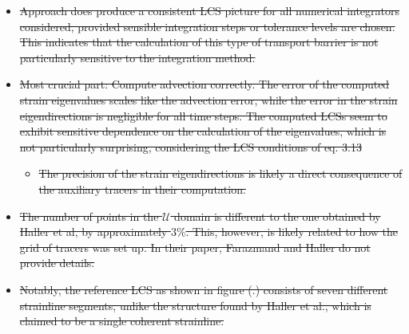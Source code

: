 \begin{framed}
    \begin{itemize}
        \item \sout{Approach does produce a consistent LCS picture for all numerical integrators considered, provided sensible
            integration steps or tolerance levels are chosen. This indicates that the calculation of this type
        of transport barrier is not particularly sensitive to the integration method.}
    \item \sout{Most crucial part: Compute advection correctly. The error of the computed strain eigenvalues scales
                like the advection error, while the error in the strain eigendirections is negligible for all time
                steps. The computed LCSs seem to exhibit sensitive dependence on the calculation of the eigenvalues,
            which is not particularly surprising, considering the LCS conditions of eq. 3.13 }
                \begin{itemize}
                    \item \sout{The precision of the strain eigendirections is likely a direct consequence of the
                        auxiliary tracers in their computation.}
                \end{itemize}
            \item \sout{The number of points in the $\mathcal{U}$ domain is different to the one obtained by
                Haller et  al, by approximately $3\%$. This, however, is likely related to how the
            grid of tracers was set up. In their paper, Farazmand and Haller do not provide details.}
        \item \sout{Notably, the reference LCS as shown in figure (.) consists of seven different strainline
                segments, unlike the structure found by Haller et al., which is claimed to be a single
            coherent strainline.}


\end{itemize}
\end{framed}
